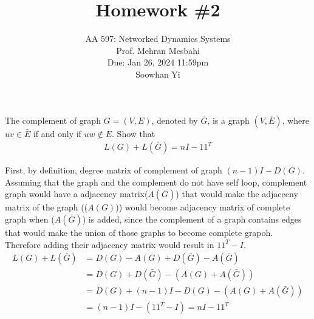 \documentclass{article}
\begin{document}
\setcounter{problem}{0}
\title{Homework \#2}
\author{
    \normalsize{AA 597: Networked Dynamics Systems}\\
    \normalsize{Prof. Mehran Mesbahi}\\
    \normalsize{Due: Jan 26, 2024 11:59pm}\\
    \normalsize{Soowhan Yi}
}
\date{{}}
\maketitle


\begin{problem}
    The complement of graph $G = (V,E)$, denoted by $\bar{G}$, is a graph $(V,\bar{E})$, where $uv \in \bar{E}$ if and only if $uw \notin E$. Show that 
    \begin{align*}
        L(G) + L(\bar{G}) = nI -11^T
    \end{align*}
    
    First, by definition, degree matrix of complement of graph $(n-1)I - D(G)$. Assuming that the graph and the complement do not have self loop, complement graph would have a adjacency matrix($A(\bar{G})$) that would make the adjacecny matrix of the graph (($A(G)$)) would become adjacency matrix of complete graph when ($A(\bar{G})$) is added, since the complement of a graph contains edges that would make the union of those graphs to become complete grapoh. Therefore adding their adjacency matrix would result in $11^T - I$.
    \begin{align*}
        L(G) + L(\bar{G}) &= D(G) - A(G) + D(\bar{G}) - A(\bar{G})\\
        &= D(G) + D(\bar{G}) - (A(G)+ A(\bar{G}))\\
        &= D(G) + (n-1)I - D(G)- (A(G)+ A(\bar{G}))\\
        &= (n-1)I - (11^T - I) = nI -11^T
    \end{align*}


\end{problem}
\end{document}

